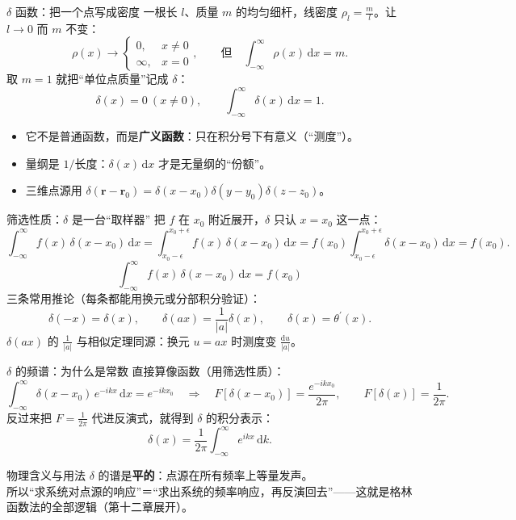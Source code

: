 \documentclass[aspectratio=169,10pt]{beamer}
\newcommand{\bhl}[1]{{\color{mid}\bfseries #1}}
\begin{document}
\begin{frame}{$\delta$ 函数：把一个点写成密度}
  {\small 一根长 $l$、质量 $m$ 的均匀细杆，线密度 $\rho_l=\frac{m}{l}$。让 $l\to0$ 而 $m$ 不变：}
  \[
    \rho(x)\to\begin{cases}0,&x\neq0\\ \infty,&x=0\end{cases},
    \qquad\text{但}\quad \int_{-\infty}^{\infty}\rho(x)\,\mathrm{d}x=m .
  \]
  {\small 取 $m=1$ 就把“单位点质量”记成 $\delta$：}
  \[
    \delta(x)=0\ (x\neq0),\qquad \int_{-\infty}^{\infty}\delta(x)\,\mathrm{d}x=1 .
  \]
  \begin{itemize}\small
    \item 它不是普通函数，而是\bhl{广义函数}：只在积分号下有意义（“测度”）。
    \item 量纲是 $1/\text{长度}$：$\delta(x)\,\mathrm{d}x$ 才是无量纲的“份额”。
    \item 三维点源用 $\delta(\bm{r}-\bm{r}_0)=\delta(x-x_0)\delta(y-y_0)\delta(z-z_0)$。
  \end{itemize}
\end{frame}

\begin{frame}{筛选性质：$\delta$ 是一台“取样器”}
  {\small 把 $f$ 在 $x_0$ 附近展开，$\delta$ 只认 $x=x_0$ 这一点：}
  \[
    \int_{-\infty}^{\infty}f(x)\,\delta(x-x_0)\,\mathrm{d}x
    =\int_{x_0-\epsilon}^{x_0+\epsilon}f(x)\,\delta(x-x_0)\,\mathrm{d}x
    =f(x_0)\int_{x_0-\epsilon}^{x_0+\epsilon}\delta(x-x_0)\,\mathrm{d}x
    =f(x_0).
  \]
  \[
    \boxed{\;\int_{-\infty}^{\infty}f(x)\,\delta(x-x_0)\,\mathrm{d}x=f(x_0)\;}
  \]
  {\small 三条常用推论（每条都能用换元或分部积分验证）：}
  \[
    \delta(-x)=\delta(x),\qquad
    \delta(ax)=\frac{1}{|a|}\delta(x),\qquad
    \delta(x)=\theta^{\prime}(x).
  \]
  {\small $\delta(ax)$ 的 $\frac{1}{|a|}$ 与相似定理同源：换元 $u=ax$ 时测度变 $\frac{\mathrm{d}u}{|a|}$。}
\end{frame}

\begin{frame}{$\delta$ 的频谱：为什么是常数}
  {\small 直接算像函数（用筛选性质）：}
  \[
    \int_{-\infty}^{\infty}\delta(x-x_0)\,e^{-ikx}\,\mathrm{d}x=e^{-ikx_0}
    \quad\Longrightarrow\quad
    F\!\left[\delta(x-x_0)\right]=\frac{e^{-ikx_0}}{2\pi},
    \qquad F\!\left[\delta(x)\right]=\frac{1}{2\pi}.
  \]
  {\small 反过来把 $F=\frac{1}{2\pi}$ 代进反演式，就得到 $\delta$ 的积分表示：}
  \[
    \delta(x)=\frac{1}{2\pi}\int_{-\infty}^{\infty}e^{ikx}\,\mathrm{d}k .
  \]
  \begin{block}{物理含义与用法}
    \small $\delta$ 的谱是\bhl{平的}：点源在所有频率上等量发声。\\
    所以“求系统对点源的响应”＝“求出系统的频率响应，再反演回去”——这就是格林函数法的全部逻辑（第十二章展开）。
  \end{block}
\end{frame}
\end{document}
